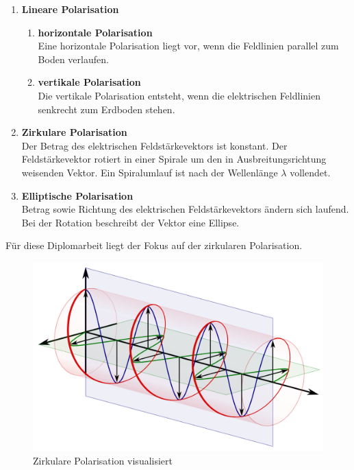 \begin{enumerate}
	\item \textbf{Lineare Polarisation}
	\begin{enumerate}
		\item \textbf{horizontale Polarisation}\\
		Eine horizontale Polarisation liegt vor, wenn die Feldlinien parallel zum Boden verlaufen.
		\item \textbf{vertikale Polarisation}\\
		Die vertikale Polarisation entsteht, wenn die elektrischen Feldlinien senkrecht zum Erdboden stehen.
	\end{enumerate}
	\item \textbf{Zirkulare Polarisation}\\
	Der Betrag des elektrischen Feldstärkevektors ist konstant. Der Feldstärkevektor rotiert in einer Spirale um den in Ausbreitungsrichtung weisenden Vektor. Ein Spiralumlauf ist nach der Wellenlänge $\lambda$ vollendet.
	\item \textbf{Elliptische Polarisation}\\
	Betrag sowie Richtung des elektrischen Feldstärkevektors ändern sich laufend. Bei der Rotation beschreibt der Vektor eine Ellipse\cite[p. 70]{Kraus-2002-AntennasB}.
\end{enumerate}

Für diese Diplomarbeit liegt der Fokus auf der zirkularen Polarisation.

\begin{figure}[h!]
	\centering
	\includegraphics[width=\textwidth]{../ref/circular-pol.png}
	\caption{Zirkulare Polarisation visualisiert \cite{noauthor_circular_2024}}
	\label{fig:circ-pol}
\end{figure}

